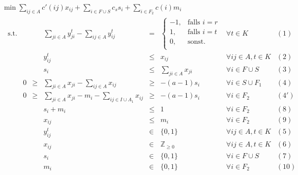 \documentclass[11pt,a4paper]{article}
\newcommand{\Z}{\mathbb{Z}}
\theoremstyle{my_th_style1}
\begin{document}
  \bigskip
  $\min \displaystyle\sum_{ij \in A} c'(ij) x_{ij} + \displaystyle\sum_{i \in F \cup S} c_s s_i + \displaystyle\sum_{i \in F_2} c(i) m_i$
  \begin{align*}
  \begin{array}{rcrcrcll}
  \textrm{s.t.}  
  && &\displaystyle\sum_{ji \in A} y_{ji}^t - \displaystyle\sum_{ij \in A} y_{ij}^t& = & \left\{\begin{array}{cl} 
  -1, & \text{falls } i=r\\ 
  1, & \text{falls } i=t\\ 
  0, & \text{sonst.}\\ 
  \end{array}
  \right. & \forall t \in K & (1) \\
  &&& y_{ij}^t & \leq & x_{ij} & \forall ij \in A, t\in K & (2)\\
    &&& s_i &\leq& \displaystyle\sum_{ji \in A} x_{ji}& \forall  i \in F \cup S & (3)\\ 
  &0&\geq&\displaystyle\sum_{ji \in A} x_{ji} - \displaystyle\sum_{ij \in A} x_{ij}&\geq& -(a-1)s_i & \forall i \in S \cup F_1& (4)\\
   &0&\geq&\displaystyle\sum_{ji \in A} x_{ji} -m_i - \displaystyle\sum_{ij \in I \cup A_1} x_{ij}&\geq& -(a-1)s_i & \forall i \in F_2& (4')\\
   &&&s_i+m_i & \leq & 1 & \forall i \in F_2 & (8)\\
   &&&x_{ij}& \leq & m_i & \forall i \in F_2 & (9) \\
    &&& y_{ij}^t & \in & \{0,1 \}& \forall ij \in A, t \in K & (5)\\
    &&& x_{ij} & \in & \Z_{\geq 0} & \forall ij \in A, t \in K & (6)\\
    &&& s_i & \in & \{ 0,1 \} & \forall i \in F \cup S & (7) \\
    &&& m_i & \in & \{ 0,1 \} & \forall i \in F_2 & (10) \\
  \end{array}
  \end{align*}
  
\end{document}
